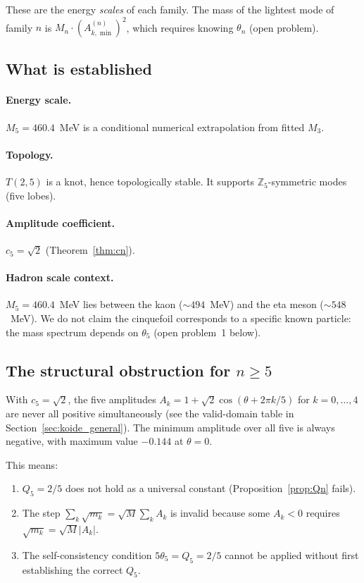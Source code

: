 \documentclass[11pt]{article}
\begin{document}
These are the energy \emph{scales} of each family.
The mass of the lightest mode of family $n$ is $M_n \cdot (A_{k,\min}^{(n)})^2$,
which requires knowing $\theta_n$ (open problem).


\label{sec:cinquefoil}

\subsection{What is established}

\paragraph{Energy scale.}
$M_5 = 460.4$~MeV is a conditional numerical extrapolation from fitted $M_3$.

\paragraph{Topology.}
$T(2,5)$ is a knot, hence topologically stable.
It supports $\mathbb{Z}_5$-symmetric modes (five lobes).

\paragraph{Amplitude coefficient.}
$c_5 = \sqrt{2}$ (Theorem~\ref{thm:cn}).

\paragraph{Hadron scale context.}
$M_5 = 460.4$~MeV lies between the kaon ($\sim 494$~MeV) and the
eta meson ($\sim 548$~MeV).
We do not claim the cinquefoil corresponds to a specific known particle:
the mass spectrum depends on $\theta_5$ (open problem~1 below).

\subsection{The structural obstruction for $n \geq 5$}

With $c_5 = \sqrt{2}$, the five amplitudes
$A_k = 1 + \sqrt{2}\cos(\theta + 2\pi k/5)$ for $k = 0,\ldots,4$
are never all positive simultaneously (see the valid-domain table in
Section~\ref{sec:koide_general}).
The minimum amplitude over all five is always negative,
with maximum value $-0.144$ at $\theta = 0$.

This means:
\begin{enumerate}
  \item $Q_5 = 2/5$ does not hold as a universal constant
    (Proposition~\ref{prop:Qn} fails).
  \item The step $\sum_k \sqrt{m_k} = \sqrt{M}\sum_k A_k$ is invalid
    because some $A_k < 0$ requires $\sqrt{m_k} = \sqrt{M}|A_k|$.
  \item The self-consistency condition $5\theta_5 = Q_5 = 2/5$
    cannot be applied without first establishing the correct $Q_5$.
\end{enumerate}
\end{document}
